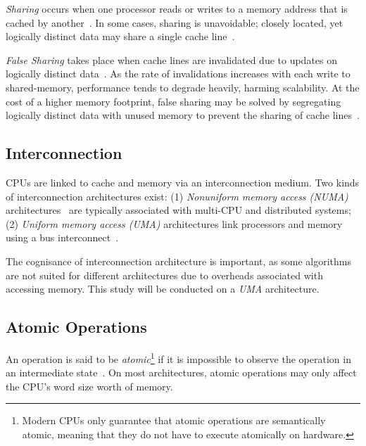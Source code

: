 \emph{Sharing} occurs when one processor reads or writes to a memory address that
is cached by another~\citep{herlihy2020art_cachecoherence}. In some cases,
sharing is unavoidable; closely located, yet
logically distinct data may share a single cache
line~\citep{herlihy2020art_cachecoherence}. 

\emph{False Sharing} takes place when cache lines are invalidated due to updates
on logically distinct data~\citep{herlihy2020art_cachecoherence}. As the
rate of invalidations increases with each write to shared-memory, performance
tends to degrade heavily, harming scalability. At the cost of a higher memory footprint, false
sharing may be solved by segregating logically distinct data with unused memory
to prevent the sharing of cache lines~\citep{scott2013shared}.

\subsection{Interconnection}

CPUs are linked to cache and memory via an interconnection medium.
Two kinds of interconnection architectures exist: (1)
\emph{Nonuniform memory access (NUMA)}
architectures~\citep[Appendix~B.3]{herlihy2020art} are typically associated with
multi-CPU and distributed systems; (2) \emph{Uniform memory
access (UMA)} architectures link processors and memory using a bus
interconnect~\citep[Appendix~B.3]{herlihy2020art}.

The cognisance of interconnection architecture is important, 
as some algorithms are not suited for different architectures due to
overheads associated with accessing memory. This study will be
conducted on a \emph{UMA} architecture.

\subsection{Atomic Operations}
An operation is said to be \emph{atomic}\footnote{Modern CPUs only guarantee
that atomic operations are semantically atomic, meaning that they do not
have to execute atomically on hardware.} if it is impossible to observe the operation in an
intermediate state~\citep{perfbook2021}. On most architectures, atomic
operations may only affect the CPU's word size worth of memory.

